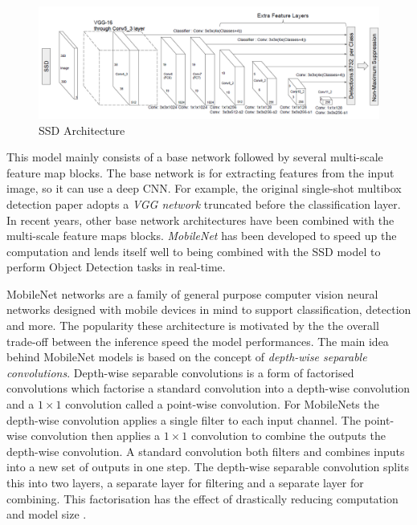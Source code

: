 \begin{figure}
\centerline{\includegraphics[scale=0.45]{images/chapter_2/ssd_network.png}}
\caption{SSD Architecture \citep{liu2016ssd}}
\label{fig:ssd_architecture}
\end{figure}

This model mainly consists of a base network followed by several multi-scale feature map blocks. The base network is for extracting features from the input image, so it can use a deep CNN. For example, the original single-shot multibox detection paper adopts a \textit{VGG network} \citep{simonyan2014very} truncated before the classification layer. In recent years, other base network architectures have been combined with the multi-scale feature maps blocks. \textit{MobileNet} has been developed to speed up the computation and lends itself well to being combined with the SSD model to perform Object Detection tasks in real-time.  

MobileNet networks \citep{howard2017mobilenets, sandler2018mobilenetv2, howard2019searching} are a family of general purpose computer vision neural networks designed with mobile devices in mind to support classification, detection and more. The popularity these architecture is motivated by the the overall trade-off between the inference speed the model performances.
The main idea behind MobileNet models is based on the concept of \textit{depth-wise separable convolutions}. Depth-wise separable convolutions is a form of factorised convolutions which factorise a standard convolution into a depth-wise convolution and a $1\times1$ convolution called a point-wise convolution. For MobileNets the depth-wise convolution applies a single filter to each input channel. The point-wise convolution then applies a $1\times1$ convolution to combine the outputs the depth-wise convolution. A standard convolution both filters and combines inputs into a new set of outputs in one step. The depth-wise separable convolution splits this into two layers, a separate layer for filtering and a separate layer for combining. This factorisation has the effect of drastically reducing computation and model size \citep{howard2017mobilenets}.


